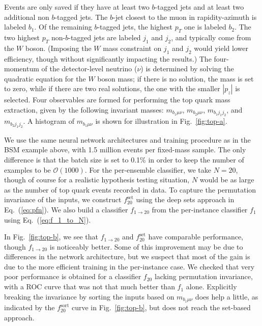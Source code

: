 \documentclass[aps,prx,reprint,preprintnumbers,superscriptaddress,nofootinbib,longbibliography,floatfix]{revtex4-2}
\DeclareRobustCommand{\Fig}[1]{Fig.~\ref{fig:#1}}
\DeclareRobustCommand{\Eq}[1]{Eq.~(\ref{eq:#1})}
\begin{document}
Events are only saved if they have at least two $b$-tagged jets and at least two additional non $b$-tagged jets.
%
The $b$-jet closest to the muon in rapidity-azimuth is labeled $b_1$.
%
Of the remaining $b$-tagged jets, the highest $p_T$ one is labeled $b_2$.
%
The two highest $p_T$ non-$b$-tagged jets are labeled $j_1$ and $j_2$, and typically come from the $W$ boson.
%
(Imposing the $W$ mass constraint on $j_1$ and $j_2$ would yield lower efficiency, though without significantly impacting the results.)
%
The four-momentum of the detector-level neutrino ($\nu$) is determined by solving the quadratic equation for the $W$ boson mass; if there is no solution, the mass is set to zero, while if there are two real solutions, the one with the smaller $|p_z|$ is selected.
%
Four observables are formed for performing the top quark mass extraction, given by the following invariant masses: $m_{b_1\mu\nu}$, $m_{b_2\mu\nu}$, $m_{b_1j_1j_2}$, and $m_{b_2j_1j_2}$.
%
A histogram of $m_{b_1\mu\nu}$ is shown for illustration in \Fig{top-a}. 



We use the same neural network architectures and training procedure as in the BSM example above, with 1.5 million events per fixed-mass sample.
%
The only difference is that the batch size is set to 0.1\% in order to keep the number of examples to be $\mathcal{O}(1000)$.
%
For the per-ensemble classifier, we take $N = 20$, though of course for a realistic hypothesis testing situation, $N$ would be as large as the number of top quark events recorded in data.
%
To capture the permutation invariance of the inputs, we construct $f_{20}^{\text{set}}$ using the deep sets approach in \Eq{pfn}.
%
We also build a classifier $f_{1 \to 20}$ from the per-instance classifier $f_1$ using \Eq{f_1_to_N}.


In \Fig{top-b}, we see that $f_{1 \to 20}$ and $f_{20}^{\text{set}}$ have comparable performance, though $f_{1 \to 20}$ is noticeably better.
%
Some of this improvement may be due to differences in the network architecture, but we suspect that most of the gain is due to the more efficient training in the per-instance case.
%
We checked that very poor performance is obtained for a classifier $f_{20}$ lacking permutation invariance, with a ROC curve that was not that much better than $f_1$ alone.
%
Explicitly breaking the invariance by sorting the inputs based on $m_{b_1\mu\nu}$ does help a little, as indicated by the $f_{20}^{\text{sort}}$ curve in \Fig{top-b}, but does not reach the set-based approach.
\end{document}
